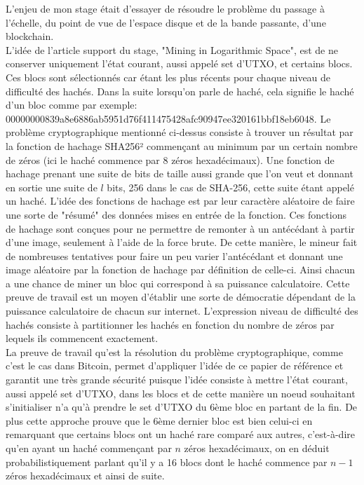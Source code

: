\documentclass[12pt,a4paper]{article}
\newcommand{\source}[1]{\hyperlink{#1}{[#1]}}
\begin{document}
	L'enjeu de mon stage était d'essayer de résoudre le problème du passage à l'échelle, du point de vue de l'espace disque et de la bande passante, d'une blockchain.\\
	L'idée de l'article support du stage, "Mining in Logarithmic Space", est de ne conserver uniquement l'état courant, aussi appelé set d'UTXO, et certains blocs. Ces blocs sont sélectionnés car étant les plus récents pour chaque niveau de difficulté des hachés. Dans la suite lorsqu'on parle de haché, cela signifie le haché d'un bloc comme par exemple:\\ 00000000839a8e6886ab5951d76f411475428afc90947ee320161bbf18eb6048. Le problème cryptographique mentionné ci-dessus consiste à trouver un résultat par la fonction de hachage SHA256² commençant au minimum par un certain nombre de zéros (ici le haché commence par 8 zéros hexadécimaux). Une fonction de hachage prenant une suite de bits de taille aussi grande que l'on veut et donnant en sortie une suite de $l$ bits, 256 dans le cas de SHA-256, cette suite étant appelé un haché. L'idée des fonctions de hachage est par leur caractère aléatoire de faire une sorte de "résumé" des données mises en entrée de la fonction. Ces fonctions de hachage sont conçues pour ne permettre de remonter à un antécédant à partir d'une image, seulement à l'aide de la force brute. De cette manière, le mineur fait de nombreuses tentatives pour faire un peu varier l'antécédant et donnant une image aléatoire par la fonction de hachage par définition de celle-ci. Ainsi chacun a une chance de miner un bloc qui correspond à sa puissance calculatoire. Cette preuve de travail est un moyen d'établir une sorte de démocratie dépendant de la puissance calculatoire de chacun sur internet. L'expression niveau de difficulté des hachés consiste à partitionner les hachés en fonction du nombre de zéros par lequels ils commencent exactement.\\ %
	La preuve de travail qu'est la résolution du problème cryptographique, comme c'est le cas dans Bitcoin, permet d'appliquer l'idée de ce papier de référence et garantit une très grande sécurité puisque l'idée consiste à mettre l'état courant, aussi appelé set d'UTXO, dans les blocs et de cette manière un noeud souhaitant s'initialiser n'a qu'à prendre le set d'UTXO du 6ème bloc en partant de la fin. De plus cette approche prouve que le 6ème dernier bloc est bien celui-ci en remarquant que certains blocs ont un haché rare comparé aux autres, c'est-à-dire qu'en ayant un haché commençant par $n$ zéros hexadécimaux, on en déduit probabilistiquement parlant qu'il y a 16 blocs dont le haché commence par $n - 1$ zéros hexadécimaux et ainsi de suite.%
	
\end{document}
